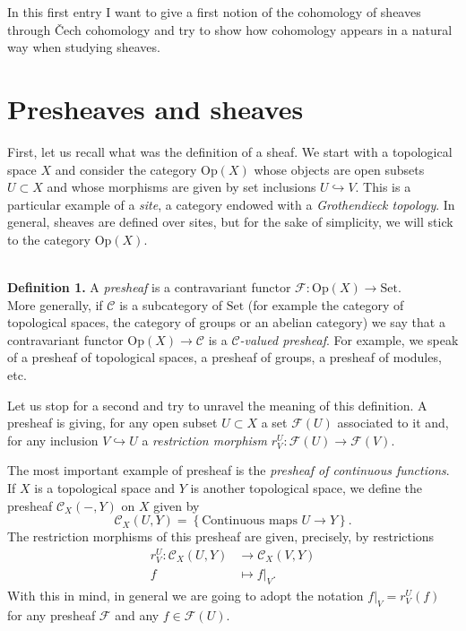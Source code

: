 In this first entry I want to give a first notion of the cohomology of sheaves through \v{C}ech cohomology and try to show how cohomology appears in a natural way when studying sheaves. 

\section*{Presheaves and sheaves}
First, let us recall what was the definition of a sheaf. We start with a topological space $X$ and consider the category $\mathrm{Op}(X)$ whose objects are open subsets $U\subset X$ and whose morphisms are given by set inclusions $U\hookrightarrow V$. This is a particular example of a \emph{site}, a category endowed with a \emph{Grothendieck topology}. In general, sheaves are defined over sites, but for the sake of simplicity, we will stick to the category $\mathrm{Op}(X)$.

\ \\ 
\textbf{Definition 1.} A \emph{presheaf} is a contravariant functor $\mathcal{F}:\mathrm{Op}(X) \rightarrow \mathrm{Set}$. \\

More generally, if $\mathcal{C}$ is a subcategory of $\mathrm{Set}$ (for example the category of topological spaces, the category of groups or an abelian category) we say that a contravariant functor $\mathrm{Op}(X) \rightarrow \mathcal{C}$ is a \emph{$\mathcal{C}$-valued presheaf}. For example, we speak of a presheaf of topological spaces, a presheaf of groups, a presheaf of modules, etc. 

Let us stop for a second and try to unravel the meaning of this definition. A presheaf is giving, for any open subset $U\subset X$ a set $\mathcal{F}(U)$ associated to it and, for any inclusion $V\hookrightarrow U$ a \emph{restriction morphism} $r^U_V: \mathcal{F}(U) \rightarrow \mathcal{F}(V)$.

The most important example of presheaf is the \emph{presheaf of continuous functions}. If $X$ is a topological space and $Y$ is another topological space, we define the presheaf $\mathcal{C}_X(-,Y)$ on $X$ given by
\begin{equation*}
  \mathcal{C}_X (U,Y) = \left\{ \text{Continuous maps } U\rightarrow Y \right\}.
\end{equation*}
The restriction morphisms of this presheaf are given, precisely, by restrictions
\begin{align*}
  r^U_V :\mathcal{C}_X(U,Y)&\longrightarrow \mathcal{C}_X(V,Y)\\ 
    f &\longmapsto f|_V. 
  \end{align*}
  With this in mind, in general we are going to adopt the notation $f|_V=r^U_V(f)$ for any presheaf $\mathcal{F}$ and any $f\in \mathcal{F}(U)$.

